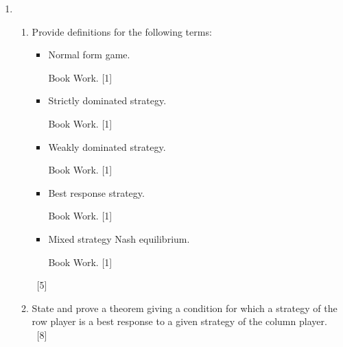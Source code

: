 \documentclass[12pt,a4paper]{article}
\renewcommand{\labelenumi}{\arabic{enumi}}
\begin{document}
\begin{enumerate}

\renewcommand\labelenumi{\bfseries\theenumi.}

\item
    \begin{enumerate}
        \item Provide definitions for the following terms:
            \begin{itemize}
                \item Normal form game.

                    \begin{solution}
                        Book Work. \hfill{[1]}
                    \end{solution}

                \item Strictly dominated strategy.

                    \begin{solution}
                        Book Work. \hfill{[1]}
                    \end{solution}

                \item Weakly dominated strategy.

                    \begin{solution}
                        Book Work. \hfill{[1]}
                    \end{solution}

                \item Best response strategy.

                    \begin{solution}
                        Book Work. \hfill{[1]}
                    \end{solution}

                \item Mixed strategy Nash equilibrium.

                    \begin{solution}
                        Book Work. \hfill{[1]}
                    \end{solution}
            \end{itemize}
            ~\hfill{[5]}

        \item State and prove a theorem giving a condition for which a strategy
            of the row player
            is a best response to a given strategy of the column player.
            ~\hfill{[8]}


\end{enumerate}
\end{enumerate}
\end{document}
